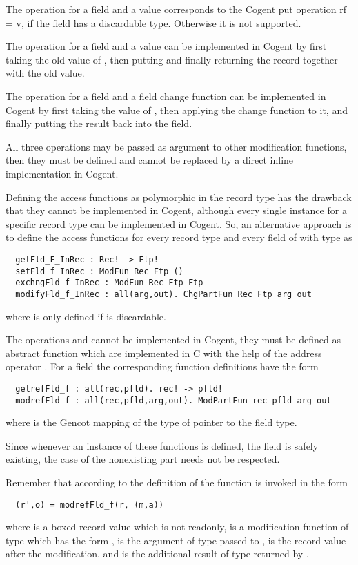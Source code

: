 The operation  for a field  and a value  corresponds to the Cogent put operation r{f = v}, if
the field has a discardable type. Otherwise it is not supported.

The operation  for a field  and a value  can be implemented in Cogent by first taking the 
old value of , then putting  and finally returning the record together with the old value.

The operation  for a field  and a field change function can be implemented in Cogent 
by first taking the value of , then applying the change function to it, and finally putting the result back into
the field. 

All three operations may be passed as argument to other modification functions, then they must be defined and cannot be replaced
by a direct inline implementation in Cogent.

Defining the access functions as polymorphic in the record type has the drawback that they cannot be implemented in Cogent, 
although every single instance for a specific record type can be implemented in Cogent. So, an alternative approach is to
define the access functions for every record type  and every field  of  with type  as
\begin{verbatim}
  getFld_F_InRec : Rec! -> Ftp!
  setFld_f_InRec : ModFun Rec Ftp ()
  exchngFld_f_InRec : ModFun Rec Ftp Ftp
  modifyFld_f_InRec : all(arg,out). ChgPartFun Rec Ftp arg out
\end{verbatim}
where  is only defined if  is discardable.

The operations  and  cannot be implemented in Cogent, they must be defined as abstract function which are implemented in 
C with the help of the address operator \code{\&}. For a field  the corresponding function definitions have the form
\begin{verbatim}
  getrefFld_f : all(rec,pfld). rec! -> pfld!
  modrefFld_f : all(rec,pfld,arg,out). ModPartFun rec pfld arg out
\end{verbatim}
where  is the Gencot mapping of the type of pointer to the field type. 

Since whenever an instance of these functions is defined, the field is safely existing, the case of the nonexisting
part needs not be respected.

Remember that according to the definition of 
 the function  is invoked in the form
\begin{verbatim}
  (r',o) = modrefFld_f(r, (m,a))
\end{verbatim}
where  is a boxed record value which is not readonly,  is a modification function of type  which
has the form ,  is the argument of type  passed to ,  is
the record value  after the modification, and  is the additional result of type  returned by .

